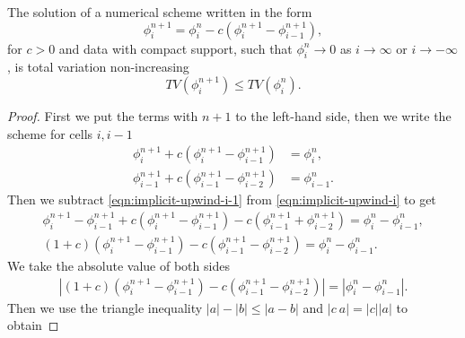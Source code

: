 \documentclass[../thesis.tex]{subfiles}
\begin{document}
\begin{theorem}
The solution of a numerical scheme written in the form
\begin{equation}\label{eqn:implicit-upwind-1d-tvd-proof}
    \phi_{i}^{n+1} =
    \phi_{i}^{n} - c\left( \phi_{i}^{n+1} - \phi_{i-1}^{n+1} \right),
\end{equation}
for \(c > 0\) and data with compact support,
such that \(\phi_{i}^{n} \rightarrow 0 \) as \(i \rightarrow \infty\)
or \(i \rightarrow -\infty\), is total variation non-increasing
\begin{equation}\label{eqn:tvd-condition}
    TV(\phi_{i}^{n+1}) \leq TV(\phi_{i}^{n}).
\end{equation}
\begin{proof}
First we put the terms with \(n+1\) to the left-hand side, then we write the scheme for cells \(i,i-1\)
    \begin{align}
        \label{eqn:implicit-upwind-i}
        \phi_{i}^{n+1}
        + c\left( \phi_{i}^{n+1} - \phi_{i-1}^{n+1} \right)
        &= \phi_{i}^{n},
        \\
        \label{eqn:implicit-upwind-i-1}
        \phi_{i-1}^{n+1}
        + c\left( \phi_{i-1}^{n+1} - \phi_{i-2}^{n+1} \right)
        &= \phi_{i-1}^{n}.
    \end{align}
Then we subtract \eqref{eqn:implicit-upwind-i-1} from \eqref{eqn:implicit-upwind-i}
to get
\begin{equation}
    \begin{split}
        \phi_{i}^{n+1} - \phi_{i-1}^{n+1}
        + c\left( \phi_{i}^{n+1} - \phi_{i-1}^{n+1}
        \right) - c\left( \phi_{i-1}^{n+1} + \phi_{i-2}^{n+1} \right)
        = \phi_{i}^{n} - \phi_{i-1}^{n},
        \\
        (1+c)\left( \phi_{i}^{n+1} - \phi_{i-1}^{n+1} \right)
        - c \left( \phi_{i-1}^{n+1} - \phi_{i-2}^{n+1} \right)
        = \phi_{i}^{n} - \phi_{i-1}^{n}.
    \end{split}
\end{equation}
We take the absolute value of both sides
\begin{equation}\label{eqn:absolute-value-equivalence}
    \begin{split}
        |(1+c)\left( \phi_{i}^{n+1} - \phi_{i-1}^{n+1} \right)
        - c \left( \phi_{i-1}^{n+1} - \phi_{i-2}^{n+1} \right)|
        = |\phi_{i}^{n} - \phi_{i-1}^{n}|.
    \end{split}
\end{equation}
Then we use the triangle inequality \(|a| - |b| \leq |a - b|\) and \(|c~a| = |c||a|\) to obtain

\end{proof}
\end{theorem}
\end{document}
